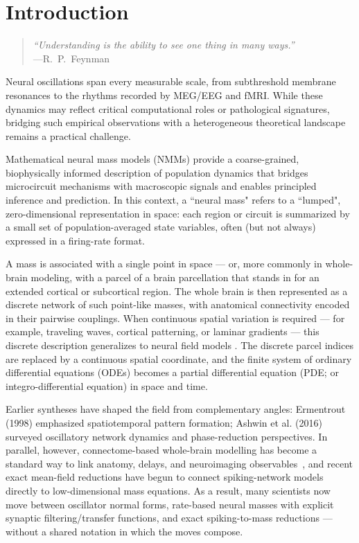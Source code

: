 \documentclass[12pt]{article}
\numberwithin{equation}{section}
\newcommand{\rev}[1]{\begingroup\color{navyblue}#1\endgroup}
\begin{document}
\setcounter{tocdepth}{2}
\tableofcontents

\clearpage


\section{Introduction} 

\begin{quote}
\emph{``Understanding is the ability to see one thing in many ways.''}\\[4pt]
\hfill ---R.~P.~Feynman
\end{quote}

  \rev{Neural oscillations span every measurable scale, from subthreshold membrane resonances to the rhythms recorded by MEG/EEG and fMRI. While these dynamics may reflect critical computational roles or pathological signatures, bridging such empirical observations with a heterogeneous theoretical landscape remains a practical challenge.
  
Mathematical neural mass models (NMMs) provide a coarse-grained, biophysically informed description of population dynamics that bridges microcircuit mechanisms with macroscopic signals and enables principled inference and prediction. In this context, a ``neural mass" refers to a ``lumped", zero-dimensional representation in space: each region or circuit is summarized by a small set of population-averaged state variables, often (but not always) expressed in a firing-rate format. 

A mass is associated with a single point in space — or, more commonly in whole-brain modeling, with a parcel of a brain parcellation that stands in for an extended cortical or subcortical region. The whole brain is then represented as a discrete network of such point-like masses, with anatomical connectivity encoded in their pairwise couplings. When continuous spatial variation is required — for example, traveling waves, cortical patterning, or laminar gradients — this discrete description generalizes to neural field models \cite{coombes2014}. The discrete parcel indices are replaced by a continuous spatial coordinate, and the finite system of ordinary differential equations (ODEs) becomes a partial differential equation (PDE; or integro-differential equation) in space and time.
  
Earlier syntheses have shaped the field from complementary angles: Ermentrout (1998) \cite{ermentrout1998neural} emphasized spatiotemporal pattern formation; Ashwin et al. (2016) \cite{ashwin2016mathematical} surveyed oscillatory network dynamics and phase-reduction perspectives. In parallel, however, connectome-based whole-brain modelling has become a standard way to link anatomy, delays, and neuroimaging observables~\cite{deco_dynamic_2008,cabral_role_2011,DavidFriston2003,castaldo2023multi,sanchez-todoPhysicalNeuralMass2023,breakspearDynamicModelsLargescale2017}, and recent exact mean-field reductions have begun to connect spiking-network models directly to low-dimensional mass equations. As a result, many scientists now move between oscillator normal forms, rate-based neural masses with explicit synaptic filtering/transfer functions, and exact spiking-to-mass reductions — without a shared notation in which the moves compose.}
\end{document}

